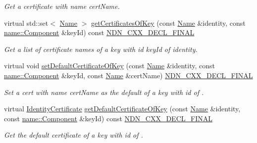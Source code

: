 \begin{DoxyCompactItemize}
\begin{DoxyCompactList}\small\item\em Get a certificate with name {\ttfamily cert\+Name}. \end{DoxyCompactList}\item 
virtual std\+::set$<$ \hyperlink{classndn_1_1Name}{Name} $>$ \hyperlink{classndn_1_1security_1_1PibSqlite3_a34c5a873d7241af9bde75c7ab7a513fb}{get\+Certificates\+Of\+Key} (const \hyperlink{classndn_1_1Name}{Name} \&identity, const \hyperlink{classndn_1_1name_1_1Component}{name\+::\+Component} \&key\+Id) const \hyperlink{ndn-cxx_2src_2common_8hpp_ab53a383abb72682805543301b5f2c244}{N\+D\+N\+\_\+\+C\+X\+X\+\_\+\+D\+E\+C\+L\+\_\+\+F\+I\+N\+AL}
\begin{DoxyCompactList}\small\item\em Get a list of certificate names of a key with id {\ttfamily key\+Id} of {\ttfamily identity}. \end{DoxyCompactList}\item 
virtual void \hyperlink{classndn_1_1security_1_1PibSqlite3_ad4fa1c0a5a8bd8ead5e239e40add6a50}{set\+Default\+Certificate\+Of\+Key} (const \hyperlink{classndn_1_1Name}{Name} \&identity, const \hyperlink{classndn_1_1name_1_1Component}{name\+::\+Component} \&key\+Id, const \hyperlink{classndn_1_1Name}{Name} \&cert\+Name) \hyperlink{ndn-cxx_2src_2common_8hpp_ab53a383abb72682805543301b5f2c244}{N\+D\+N\+\_\+\+C\+X\+X\+\_\+\+D\+E\+C\+L\+\_\+\+F\+I\+N\+AL}
\begin{DoxyCompactList}\small\item\em Set a cert with name {\ttfamily cert\+Name} as the default of a key with id  of . \end{DoxyCompactList}\item 
virtual \hyperlink{classndn_1_1IdentityCertificate}{Identity\+Certificate} \hyperlink{classndn_1_1security_1_1PibSqlite3_a61dbc8691de8b1ecfc045d803df781d7}{get\+Default\+Certificate\+Of\+Key} (const \hyperlink{classndn_1_1Name}{Name} \&identity, const \hyperlink{classndn_1_1name_1_1Component}{name\+::\+Component} \&key\+Id) const \hyperlink{ndn-cxx_2src_2common_8hpp_ab53a383abb72682805543301b5f2c244}{N\+D\+N\+\_\+\+C\+X\+X\+\_\+\+D\+E\+C\+L\+\_\+\+F\+I\+N\+AL}
\begin{DoxyCompactList}\small\item\em Get the default certificate of a key with id  of . \end{DoxyCompactList}\end{DoxyCompactItemize}


